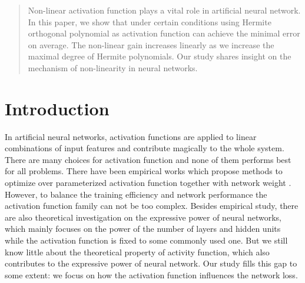 \documentclass[conference]{IEEEtran}
\begin{document}
\begin{abstract}
Non-linear activation function plays a vital role in artificial neural network.
In this paper, we show that under certain conditions using Hermite orthogonal polynomial as activation function
can achieve the minimal error on average. The non-linear gain increases linearly as we increase the maximal degree of Hermite polynomials. Our study shares insight on the mechanism of non-linearity in neural networks.
\end{abstract}



\section{Introduction}
In artificial neural networks, activation functions are applied to linear combinations of input features and contribute magically to the whole system.
There are many choices for activation function and none of them performs best for all problems. There have been empirical works which propose methods  to optimize over parameterized activation function together with network weight \cite{ramachandran2017searching}.
However, to balance the training efficiency and network performance the activation function family can not be too complex\cite{laudani2015training}.
Besides empirical study, there are also theoretical investigation on the expressive power of neural networks, which mainly focuses on the power of the number of layers and hidden units while the activation function is fixed to some commonly used one\cite{AroraBMM18}. But we still know little about the theoretical property of activity function, which also contributes to the expressive power of neural network. Our study fills this gap to some extent: we focus on how the activation function influences the network loss.
\end{document}
